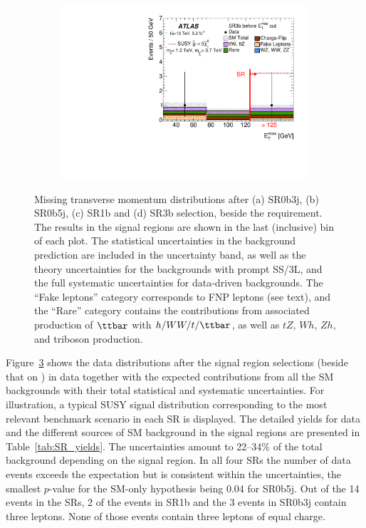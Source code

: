 \begin{figure}[t!]
\begin{subfigure}[t]{0.49\textwidth}
\caption{}\label{fig:Results_SR1b}\end{subfigure}
\begin{subfigure}[t]{0.49\textwidth}\includegraphics[width=\textwidth]{FIGURES/CONF_SR3b.pdf}
\caption{}\label{fig:Results_SR3b}\end{subfigure}
\caption{Missing transverse momentum distributions after (a) SR0b3j, (b) SR0b5j, (c) SR1b and (d) SR3b selection, beside the \met requirement. 
The results in the signal regions are shown in the last (inclusive) bin of each plot. 
The statistical uncertainties in the background prediction are included in the uncertainty band, 
as well as the theory uncertainties for the backgrounds with prompt SS/3L, 
and the full systematic uncertainties for data-driven backgrounds. 
The ``Fake leptons'' category corresponds to FNP leptons (see text), 
and the ``Rare'' category contains the contributions from associated production of $\ttbar$ with $h/WW/t/\ttbar$, 
as well as $tZ$, $Wh$, $Zh$, and triboson production. 
}
\label{fig:Results_SR_metD} 
\end{figure} 


Figure~\ref{fig:Results_SR_metD} shows the data \met distributions after the signal region selections (beside that on \met) in data 
together with the expected contributions from all the SM backgrounds with their total statistical and systematic uncertainties. 
For illustration, a typical SUSY signal distribution corresponding to the most relevant benchmark scenario 
in each SR is displayed.
The detailed yields for data and the different sources of SM background in the signal regions 
are presented in Table~\ref{tab:SR_yields}. 
The uncertainties amount to 22--34\% of the total background depending on the signal region. 
In all four SRs the number of data events exceeds the expectation but is consistent within the uncertainties, 
the smallest $p$-value for the SM-only hypothesis being 0.04 for SR0b5j. 
Out of the 14 events in the SRs, 2 of the events in SR1b and the 3 events in SR0b3j contain three leptons. 
None of those events contain three leptons of equal charge. 

